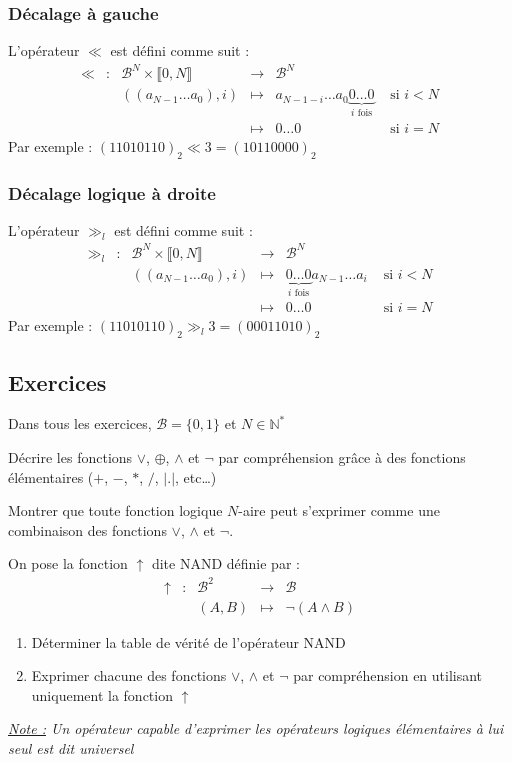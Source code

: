 \documentclass[../../main.tex]{subfiles}
\begin{document}
\subsubsection{Décalage à gauche}
\label{ssub:d_calage_gauche}
L'opérateur $\ll$ est défini comme suit :
$$
\begin{array}{lclcll}
\ll & : & \mathcal{B}^{N}\times{\llbracket0, N\rrbracket} & \rightarrow & \mathcal{B}^{N} \\
     &   & ((a_{N-1}\dots a_{0}), i) & \mapsto & a_{N-1-i}\dots a_{0}\underbrace{0\dots 0}_{\text{$i$ fois}} & \text{ si $i < N$} \\
     &   & & \mapsto & 0\dots 0 & \text{ si $i = N$}
\end{array}
$$
Par exemple : $(11010110)_2 \ll 3= (10110000)_2$
\subsubsection{Décalage logique à droite}\label{ssub:d_calage_logique_droite}
L'opérateur $\gg_{l}$ est défini comme suit :
$$
\begin{array}{lclcll}
\gg_{l} & : & \mathcal{B}^{N}\times{\llbracket0, N\rrbracket} & \rightarrow & \mathcal{B}^{N} \\
     &   & ((a_{N-1}\dots a_{0}), i) & \mapsto & \underbrace{0\dots 0}_{\text{$i$ fois}}a_{N-1}\dots a_{i} & \text{ si $i < N$} \\
     &   & & \mapsto & 0\dots 0 & \text{ si $i = N$}
\end{array}
$$
Par exemple : $(11010110)_2 \gg_l 3 = (00011010)_2$
\subsection{Exercices}
Dans tous les exercices, $\mathcal{B} = \{0, 1\}$ et $N\in\mathbb{N}^{*}$

 Décrire les fonctions $\vee$, $\oplus$, $\wedge$ et $\neg$ par compréhension grâce à des fonctions élémentaires ($+$, $-$, $*$, $/$, $|.|$, etc\dots)

 Montrer que toute fonction logique $N$-aire peut s'exprimer comme une combinaison des fonctions $\vee$, $\wedge$ et $\neg$.

 On pose la fonction $\uparrow$ dite \og NAND \fg définie par :
$$
\begin{array}{lclcl}
\uparrow & : & \mathcal{B}^{2} & \rightarrow & \mathcal{B} \\
& & (A, B) & \mapsto & \neg{(A\wedge{B})}
\end{array}
$$
\begin{enumerate}
    \item Déterminer la table de vérité de l'opérateur NAND
    \item Exprimer chacune des fonctions $\vee$, $\wedge$ et $\neg$ par compréhension en utilisant uniquement la fonction $\uparrow$
\end{enumerate}
\textit{\underline{Note :} Un opérateur capable d'exprimer les opérateurs logiques élémentaires à lui seul est dit \og universel \fg}
\end{document}
